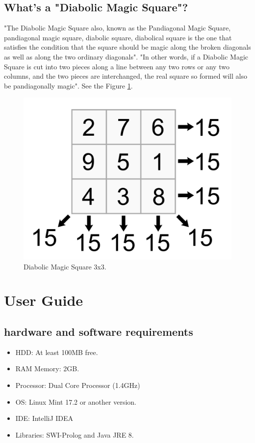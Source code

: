 \documentclass[12pt]{article}
\begin{document}
\subsection{What's a "Diabolic Magic Square"?}
"The Diabolic Magic Square also, known as the Pandiagonal Magic Square, pandiagonal magic square, diabolic square, diabolical square is the one that satisfies the condition that the square should be magic along the broken diagonals as well as along the two ordinary diagonals"\cite{whatis}.
\newline
"In other words, if a Diabolic Magic Square is cut into two pieces along a line between any two rows or any two columns, and the two pieces are interchanged, the real square so formed will also be pandiagonally magic"\cite{whatis}.
See the Figure \ref{DMS}.
\begin{figure}[h!]
 	\centering
  	\includegraphics[scale=0.06]
  	{Images/DMS.png}
  	\caption{Diabolic Magic Square 3x3.}
     \label{DMS}
\end{figure}




\newpage
\section{User Guide}
\subsection{hardware and software requirements}
\begin{itemize}
\item HDD: At least 100MB free.
\item RAM Memory: 2GB.
\item Processor: Dual Core Processor (1.4GHz)
\item OS: Linux Mint 17.2 or another version.
\item IDE: IntelliJ IDEA 
\item Libraries: SWI-Prolog and Java JRE 8.
\end{itemize}
\end{document}
